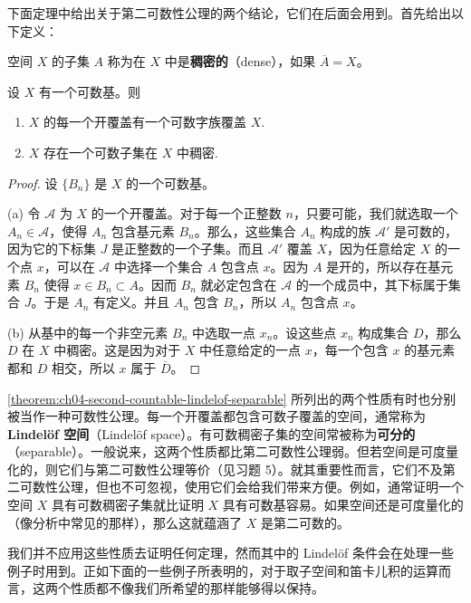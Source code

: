 下面定理中给出关于第二可数性公理的两个结论，它们在后面会用到。首先给出以下定义：

\begin{definition}\label{definition:ch04-dense}
空间 $X$ 的子集 $A$ 称为在 $X$ 中是\textbf{稠密的}（dense），如果 $\overline{A}=X$。
\end{definition}

\begin{theorem}\label{theorem:ch04-second-countable-lindelof-separable}
设 $X$ 有一个可数基。则
\begin{enumerate}
\item $X$ 的每一个开覆盖有一个可数字族覆盖 $X$.
\item $X$ 存在一个可数子集在 $X$ 中稠密.
\end{enumerate}
\end{theorem}

\begin{proof}
设 $\{B_{n}\}$ 是 $X$ 的一个可数基。

(a) 令 $\mathcal{A}$ 为 $X$ 的一个开覆盖。对于每一个正整数 $n$，只要可能，我们就选取一个 $A_{n}\in\mathcal{A}$，使得 $A_{n}$ 包含基元素 $B_{n}$。那么，这些集合 $A_{n}$ 构成的族 $\mathcal{A}'$ 是可数的，因为它的下标集 $J$ 是正整数的一个子集。而且 $\mathcal{A}'$ 覆盖 $X$，因为任意给定 $X$ 的一个点 $x$，可以在 $\mathcal{A}$ 中选择一个集合 $A$ 包含点 $x$。因为 $A$ 是开的，所以存在基元素 $B_{n}$ 使得 $x\in B_{n}\subset A$。因而 $B_{n}$ 就必定包含在 $\mathcal{A}$ 的一个成员中，其下标属于集合 $J$。于是 $A_{n}$ 有定义。并且 $A_{n}$ 包含 $B_{n}$，所以 $A_{n}$ 包含点 $x$。

(b) 从基中的每一个非空元素 $B_{n}$ 中选取一点 $x_{n}$。设这些点 $x_{n}$ 构成集合 $D$，那么 $D$ 在 $X$ 中稠密。这是因为对于 $X$ 中任意给定的一点 $x$，每一个包含 $x$ 的基元素都和 $D$ 相交，所以 $x$ 属于 $\overline{D}$。
\end{proof}

\cref{theorem:ch04-second-countable-lindelof-separable} 所列出的两个性质有时也分别被当作一种可数性公理。每一个开覆盖都包含可数子覆盖的空间，通常称为\textbf{Lindelöf 空间}（Lindelöf space）。有可数稠密子集的空间常被称为\textbf{可分的}（separable）。一般说来，这两个性质都比第二可数性公理弱。但若空间是可度量化的，则它们与第二可数性公理等价（见习题 5）。就其重要性而言，它们不及第二可数性公理，但也不可忽视，使用它们会给我们带来方便。例如，通常证明一个空间 $X$ 具有可数稠密子集就比证明 $X$ 具有可数基容易。如果空间还是可度量化的（像分析中常见的那样），那么这就蕴涵了 $X$ 是第二可数的。

我们并不应用这些性质去证明任何定理，然而其中的 Lindelöf 条件会在处理一些例子时用到。正如下面的一些例子所表明的，对于取子空间和笛卡儿积的运算而言，这两个性质都不像我们所希望的那样能够得以保持。

